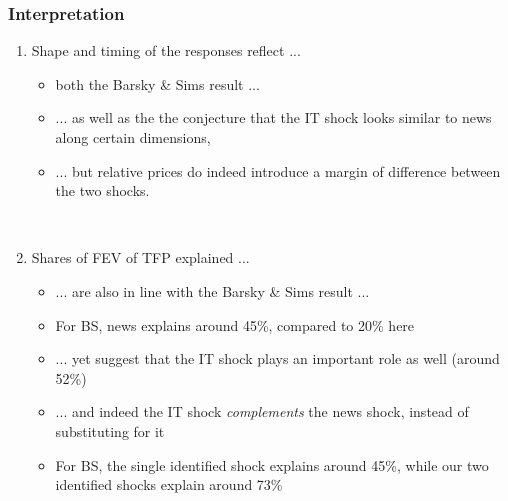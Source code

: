 \documentclass{beamer}
\begin{document}
\begin{frame}
	\frametitle{Interpretation}

\begin{enumerate}
 \item Shape and timing of the responses reflect ...
 
 
	\begin{itemize}
	\item both the Barsky \& Sims result ...
	
	\vspace{0.1cm}
	
	\item ... as well as the the conjecture that the IT shock looks similar to news along certain dimensions, 
	
	\vspace{0.1cm}
	
	\item ... but relative prices do indeed introduce a margin of difference between the two shocks.
	\end{itemize}

\

\item Shares of FEV of TFP explained ...
	\begin{itemize}
	\item ... are also in line with the Barsky \& Sims result ...
	\item [] For BS, news explains around 45\%, compared to 20\% here
	
	\vspace{0.1cm}
	
	\item ... yet suggest that the IT shock plays an important role as well (around 52\%)
	
	\vspace{0.1cm}
	
	\item ... and indeed the IT shock \emph{complements} the news shock, instead of substituting for it
	\item [] For BS, the single identified shock explains around 45\%, while our two identified shocks explain around 73\%
	\end{itemize}

\end{enumerate}
		 	
\end{frame}
\end{document}
